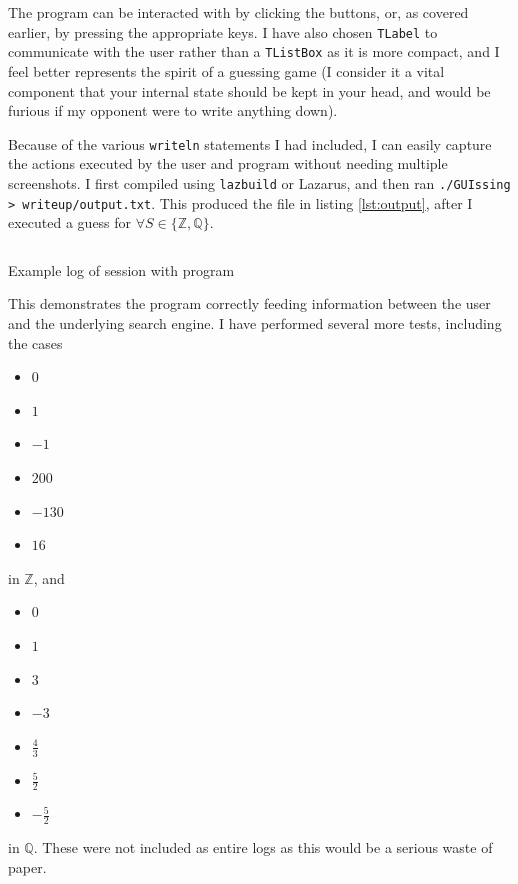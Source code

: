 \documentclass[a4paper,11pt]{article}
\newenvironment{longlisting}
{\addvspace{\baselineskip}\captionsetup{type=listing}}
{\addvspace{\baselineskip}}
\begin{document}
    The program can be interacted with by clicking the buttons, or, as covered
    earlier, by pressing the appropriate keys. I have also chosen
    \texttt{TLabel} to communicate with the user rather than a \texttt{TListBox}
    as it is more compact, and I feel better represents the spirit of a guessing
    game (I consider it a vital component that your internal state should be
    kept in your head, and would be furious if my opponent were to write
    anything down).

    Because of the various \texttt{writeln} statements I had
    included, I can easily capture the actions executed by the user and program
    without needing multiple screenshots. I first compiled using
    \texttt{lazbuild} or Lazarus, and then ran
    \texttt{./GUIssing > writeup/output.txt}.
    This produced the file in listing \ref{lst:output}, after I executed a guess
    for $\forall S \in \{\mathbb{Z}, \mathbb{Q}\}$.

\begin{longlisting}
\inputminted{text}{output.txt}
\caption{Example log of session with program}\label{lst:output}
\end{longlisting}

    This demonstrates the program correctly feeding information between the user
    and the underlying search engine. I have performed several more tests,
    including the cases

    \begin{itemize}
    \item $0$
    \item $1$
    \item $-1$
    \item $200$
    \item $-130$
    \item $16$
    \end{itemize}
    in $\mathbb{Z}$, and
    \begin{itemize}
    \item $0$
    \item $1$
    \item $3$
    \item $-3$
    \item $\frac{4}{3}$
    \item $\frac{5}{2}$
    \item $-\frac{5}{2}$
    \end{itemize}
    in $\mathbb{Q}$. These were not included as entire logs as this would be a
    serious waste of paper.
\end{document}
